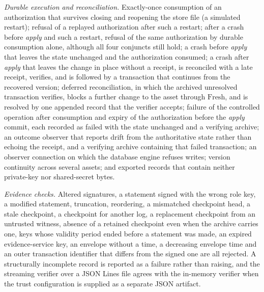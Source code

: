\documentclass[journal]{IEEEtran}
\newcommand{\Fresh}{\mathrm{Fresh}}
\begin{document}
\emph{Durable execution and reconciliation.} Exactly-once consumption of an authorization that survives closing and reopening the store file (a simulated restart); refusal of a replayed authorization after such a restart; after a crash before \emph{apply} and such a restart, refusal of the same authorization by durable consumption alone, although all four conjuncts still hold; a crash before \emph{apply} that leaves the state unchanged and the authorization consumed; a crash after \emph{apply} that leaves the change in place without a receipt, is reconciled with a late receipt, verifies, and is followed by a transaction that continues from the recovered version; deferred reconciliation, in which the archived unresolved transaction verifies, blocks a further change to the asset through $\Fresh$, and is resolved by one appended record that the verifier accepts; failure of the controlled operation after consumption and expiry of the authorization before the \emph{apply} commit, each recorded as failed with the state unchanged and a verifying archive; an outcome observer that reports drift from the authoritative state rather than echoing the receipt, and a verifying archive containing that failed transaction; an observer connection on which the database engine refuses writes; version continuity across several assets; and exported records that contain neither private-key nor shared-secret bytes.

\emph{Evidence checks.} Altered signatures, a statement signed with the wrong role key, a modified statement, truncation, reordering, a mismatched checkpoint head, a stale checkpoint, a checkpoint for another log, a replacement checkpoint from an untrusted witness, absence of a retained checkpoint even when the archive carries one, keys whose validity period ended before a statement was made, an expired evidence-service key, an envelope without a time, a decreasing envelope time and an outer transaction identifier that differs from the signed one are all rejected. A structurally incomplete record is reported as a failure rather than raising, and the streaming verifier over a JSON Lines file agrees with the in-memory verifier when the trust configuration is supplied as a separate JSON artifact.
\end{document}
